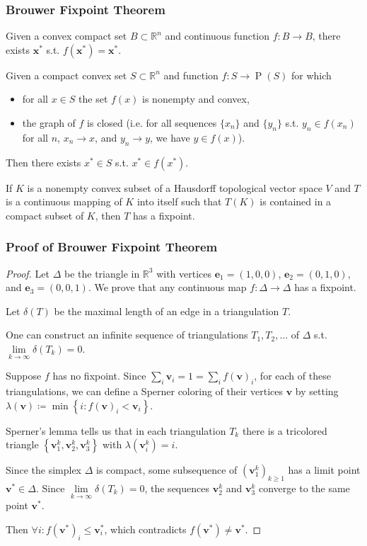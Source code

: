 \documentclass[UTF8,11pt,colorlinks,compress,openany]{beamer}%
\begin{document}
\begin{frame}\frametitle{Brouwer Fixpoint Theorem}
\begin{theorem}
Given a convex compact set $B\subset\mathbb{R}^n$ and continuous function $f: B\to B$, there exists $\mathbf{x}^*$ s.t. $f(\mathbf{x}^*)=\mathbf{x}^*$.
\end{theorem}
\begin{theorem}
Given a compact convex set $S\subset\mathbb{R}^n$ and function $f: S\to \operatorname{P}(S)$ for which
\begin{itemize}
	\item for all $x\in S$ the set $f(x)$ is nonempty and convex,
	\item the graph of $f$ is closed (i.e. for all sequences $\{x_n\}$ and $\{y_n\}$ s.t. $y_n\in f(x_n)$ for all $n$, $x_n\to x$, and $y_n\to y$, we have $y\in f(x)$).
\end{itemize}
Then there exists $x^*\in S$ s.t. $x^*\in f(x^*)$.
\end{theorem}
\begin{theorem}
If $K$ is a nonempty convex subset of a Hausdorff topological vector space $V$ and $T$ is a continuous mapping of $K$ into itself such that $T(K)$ is contained in a compact subset of $K$, then $T$ has a fixpoint.
\end{theorem}
\end{frame}

\begin{frame}\frametitle{Proof of Brouwer Fixpoint Theorem}
\begin{proof}
Let $\Delta$ be the triangle in $\mathbb{R}^3$ with vertices $\mathbf{e}_1=(1, 0, 0)$, $\mathbf{e}_2=(0, 1, 0)$, and $\mathbf{e}_3=(0, 0, 1)$. We prove that any continuous map $f:\Delta\to\Delta$ has a fixpoint.

Let $\delta(T)$ be the maximal length of an edge in a triangulation $T$.

One can construct an infinite sequence of triangulations $T_1, T_2,\dots$ of $\Delta$ s.t. $\lim\limits_{k\to\infty}\delta(T_k)=0$.

Suppose $f$ has no fixpoint. Since $\sum_i \mathbf{v}_i=1=\sum_i f(\mathbf{v})_i$, for each of these triangulations, we can define a Sperner coloring of their vertices $\mathbf{v}$ by setting $\lambda(\mathbf{v})\coloneqq \min\left\{i: f(\mathbf{v})_i<\mathbf{v}_i\right\}$.

Sperner's lemma tells us that in each triangulation $T_k$ there is a tricolored triangle $\left\{\mathbf{v}_1^k,\mathbf{v}_2^k,\mathbf{v}_3^k\right\}$ with $\lambda(\mathbf{v}_i^k)=i$.

Since the simplex $\Delta$ is compact, some subsequence of $\left(\mathbf{v}_1^k\right)_{k\geq 1}$ has a limit point $\mathbf{v}^*\in\Delta$. Since $\lim\limits_{k\to\infty}\delta(T_k)=0$, the sequences $\mathbf{v}_2^k$ and $\mathbf{v}_3^k$ converge to the same point $\mathbf{v}^*$.

Then $\forall i: f(\mathbf{v}^*)_i\leq\mathbf{v}^*_i$, which contradicts $f(\mathbf{v}^*)\neq\mathbf{v}^*$.
\end{proof}
\end{frame}
\end{document}
